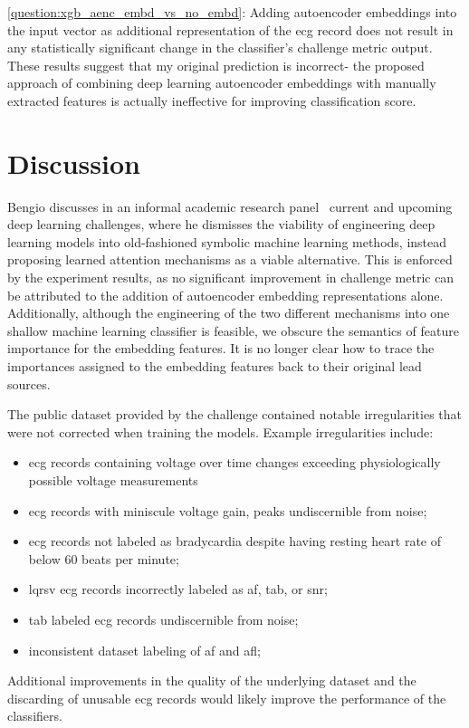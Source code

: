 \documentclass[\main/thesis.tex]{subfiles}
\begin{document}
\ref{question:xgb_aenc_embd_vs_no_embd}: Adding autoencoder embeddings into the input vector as additional representation of the \gls{ecg} record does not result in any statistically significant change in the classifier's challenge metric output.
These results suggest that my original prediction is incorrect- the proposed approach of combining deep learning autoencoder embeddings with manually extracted features is actually ineffective for improving classification score.

\section{Discussion}

Bengio discusses in an informal academic research panel~\cite{2020-yoshua-dlc} current and upcoming deep learning challenges, where he dismisses the viability of engineering deep learning models into old-fashioned symbolic machine learning methods, instead proposing learned attention mechanisms as a viable alternative.
This is enforced by the experiment results, as no significant improvement in challenge metric can be attributed to the addition of autoencoder embedding representations alone.
Additionally, although the engineering of the two different mechanisms into one shallow machine learning classifier is feasible, we obscure the semantics of feature importance for the embedding features.
It is no longer clear how to trace the importances assigned to the embedding features back to their original lead sources.

The public dataset provided by the challenge contained notable irregularities that were not corrected when training the models.
Example irregularities include: 
\begin{itemize}
    \item \gls{ecg} records containing voltage over time changes exceeding physiologically possible voltage measurements
    \item \gls{ecg} records with miniscule voltage gain, peaks undiscernible from noise;
    \item \gls{ecg} records not labeled as bradycardia despite having resting heart rate of below 60 beats per minute;
    \item \gls{lqrsv} \gls{ecg} records incorrectly labeled as \gls{af}, \gls{tab}, or \gls{snr};
    \item \gls{tab} labeled \gls{ecg} records undiscernible from noise;
    \item inconsistent dataset labeling of \gls{af} and \gls{afl};
\end{itemize}
Additional improvements in the quality of the underlying dataset and the discarding of unusable \gls{ecg} records would likely improve the performance of the classifiers.
\end{document}
